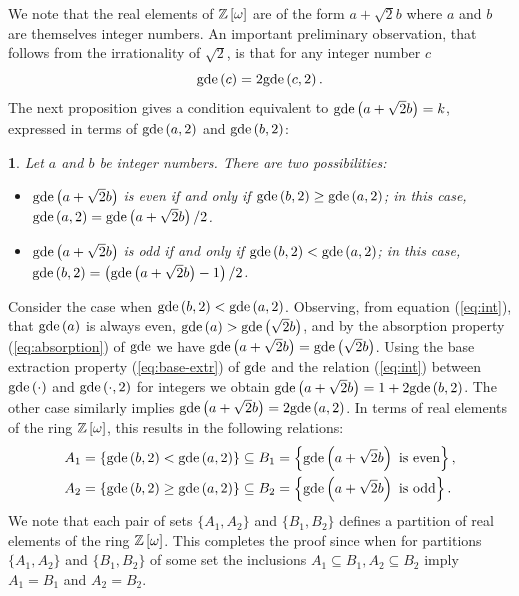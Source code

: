 \documentclass[english,journal]{extarticle}
\makeatletter
\theoremstyle{plain}
\theoremstyle{plain}
\theoremstyle{plain}
\theoremstyle{definition}
\theoremstyle{plain}
\newenvironment{proof}[1][\proofname]{\par
     \normalfont\topsep6\p@\@plus6\p@\relax
     \trivlist
     \itemindent\parindent
     \item[\hskip\labelsep
           \scshape
       #1]\ignorespaces
   }{%
     \endtrivlist\@endpefalse
   }
\providecommand{\proofname}{Proof}
\theoremstyle{plain}
\newtheorem{prop}{\protect\propositionname}
\providecommand{\propositionname}{\inputencoding{latin9}Proposition}
\makeatother
\begin{document}
We note that the real elements of $\mathbb{Z}\left[\omega\right]$ are of the form $a+\sqrt{2}b$
where $a$ and $b$ are themselves integer numbers.  An important preliminary observation, that
follows from the irrationality of $\sqrt{2}$, is that for any integer number
$c$ 
\begin{equation}
\mathbf{\mathrm{gde}}\left(c\right)=2\mathbf{\mathrm{gde}}\left(c,2\right).\label{eq:int}
\end{equation}
The next proposition gives a condition equivalent to
$\mathbf{\mathrm{gde}}\left(a+\sqrt{2}b\right)=k$,
expressed in terms of $\mathbf{\mathrm{gde}}\left(a,2\right)$ and $\mathbf{\mathrm{gde}}\left(b,2\right)$: 
\begin{prop}
\label{prop:gdeeee}Let $a$ and \textbf{$b$} be integer numbers. There
are two possibilities:
\begin{itemize}
\item $\mathbf{\mathrm{gde}}\left(a+\sqrt{2}b\right)$ is even if and only if
$\mathbf{\mathrm{gde}}\left(b,2\right)\ge\mathbf{\mathrm{gde}}\left(a,2\right)$;
in this case, $\mathbf{\mathrm{gde}}\left(a,2\right)=\mathbf{\mathrm{gde}}\left(a+\sqrt{2}b\right)/2$. 
\item $\mathbf{\mathrm{gde}}\left(a+\sqrt{2}b\right)$ is odd if and only if
$\mathbf{\mathrm{gde}}\left(b,2\right)<\mathbf{\mathrm{gde}}\left(a,2\right)$;
in this case,
$\mathbf{\mathrm{gde}}\left(b,2\right)=\left(\mathbf{\mathrm{gde}}\left(a+\sqrt{2}b\right)-1\right)/2$.
\end{itemize}
\end{prop}
\begin{proof}
Consider the case when $\mathbf{\mathrm{gde}}\left(b,2\right)<\mathbf{\mathrm{gde}}\left(a,2\right)$.
Observing, from equation (\ref{eq:int}), that $\mathbf{\mathrm{gde}}\left(a\right)$ is always even,
$\mathbf{\mathrm{gde}}\left(a\right)>\mathbf{\mathrm{gde}}\left(\sqrt{2}b\right)$,
and by the absorption property (\ref{eq:absorption}) of $\mathbf{\mathrm{gde}}$ we
have $\mathbf{\mathrm{gde}}\left(a+\sqrt{2}b\right)=\mathbf{\mathrm{gde}}\left(\sqrt{2}b\right)$. Using
the base extraction property (\ref{eq:base-extr}) of $\mathbf{\mathrm{gde}}$ and the 
relation (\ref{eq:int}) between $\mathbf{\mathrm{gde}}\left(\cdot\right)$ and
$\mathbf{\mathrm{gde}}\left(\cdot,2\right)$
for integers we obtain $\mathbf{\mathrm{gde}}\left(a+\sqrt{2}b\right)=1+2\mathbf{\mathrm{gde}}\left(b,2\right)$.
The other case similarly implies
$\mathbf{\mathrm{gde}}\left(a+\sqrt{2}b\right)=2\mathbf{\mathrm{gde}}\left(a,2\right)$.
In terms of real elements of the ring $\mathbb{Z}\left[\omega\right]$, this results in the following
relations: 
\begin{align*}
A_{1}=\left\{ \mathbf{\mathrm{gde}}\left(b,2\right)<\mathbf{\mathrm{gde}}\left(a,2\right)\right\}  & \subseteq
B_{1}=\left\{ \mathbf{\mathrm{gde}}\left(a+\sqrt{2}b\right)\mbox{ is even}\right\}, \\
A_{2}=\left\{ \mathbf{\mathrm{gde}}\left(b,2\right)\ge\mathbf{\mathrm{gde}}\left(a,2\right)\right\}  & \subseteq
B_{2}=\left\{ \mathbf{\mathrm{gde}}\left(a+\sqrt{2}b\right)\mbox{ is odd}\right\}. 
\end{align*}
We note that each pair of sets $\{A_{1},A_{2}\}$ and $\{B_{1},B_{2}\}$ defines
a partition of real elements of the ring $\mathbb{Z}\left[\omega\right]$. This completes the proof since when for partitions $\{A_{1},A_{2}\}$ and $\{B_{1},B_{2}\}$
of some set the inclusions $A_{1}\subseteq B_{1},A_{2}\subseteq B_{2}$
imply $A_{1}=B_{1}$ and $A_{2}=B_{2}$.
\end{proof}
\end{document}
